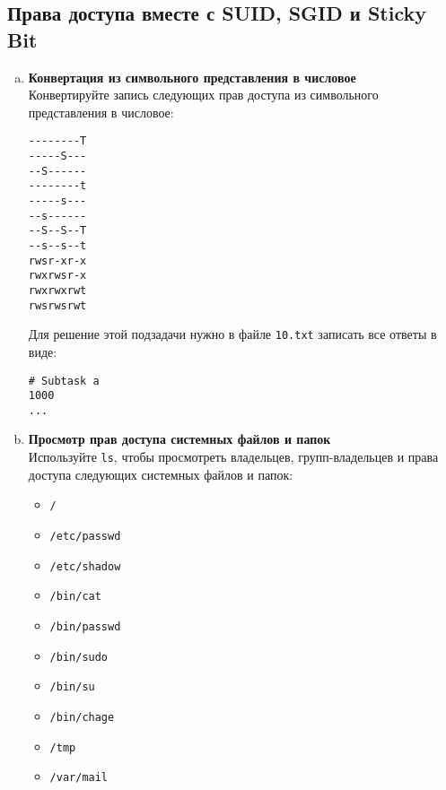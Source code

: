 \documentclass{article}
\begin{document}
\subsection{Права доступа вместе с SUID, SGID и Sticky Bit}

\begin{enumerate}[a.]
\item \textbf{Конвертация из символьного представления в числовое}\\
Конвертируйте запись следующих прав доступа из символьного представления в числовое:
\begin{lstlisting}
--------T
-----S---
--S------
--------t
-----s---
--s------
--S--S--T
--s--s--t
rwsr-xr-x
rwxrwsr-x
rwxrwxrwt
rwsrwsrwt
\end{lstlisting}
Для решение этой подзадачи нужно в файле \texttt{10.txt} записать все ответы в виде:
\begin{lstlisting}
# Subtask a
1000
...
\end{lstlisting}

\item \textbf{Просмотр прав доступа системных файлов и папок}\\
Используйте \texttt{ls}, чтобы просмотреть владельцев, групп-владельцев и права доступа следующих системных файлов и папок:
\begin{itemize}
\item \texttt{/}
\item \texttt{/etc/passwd}
\item \texttt{/etc/shadow}
\item \texttt{/bin/cat}
\item \texttt{/bin/passwd}
\item \texttt{/bin/sudo}
\item \texttt{/bin/su}
\item \texttt{/bin/chage}
\item \texttt{/tmp}
\item \texttt{/var/mail}
\end{itemize}
\end{enumerate}


\iffalse
\newpage
~
\newpage
\end{document}

